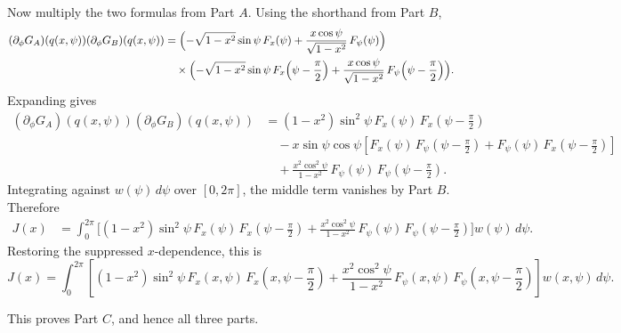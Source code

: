 Now multiply the two formulas from Part \(A\). Using the shorthand from Part \(B\),
\[
\begin{aligned}
(\partial_\phi G_A)(q(x,\psi))(\partial_\phi G_B)(q(x,\psi))
&=
\Bigl(
-\sqrt{1-x^2}\sin\psi\,F_x(\psi)
+
\frac{x\cos\psi}{\sqrt{1-x^2}}\,F_\psi(\psi)
\Bigr)\\
&\quad\times
\Bigl(
-\sqrt{1-x^2}\sin\psi\,F_x\!\left(\psi-\frac{\pi}{2}\right)
+
\frac{x\cos\psi}{\sqrt{1-x^2}}\,F_\psi\!\left(\psi-\frac{\pi}{2}\right)
\Bigr).
\end{aligned}
\]
Expanding gives
\[
\begin{aligned}
(\partial_\phi G_A)(q(x,\psi))(\partial_\phi G_B)(q(x,\psi))
&=
(1-x^2)\sin^2\psi\,F_x(\psi)\,F_x\!\left(\psi-\frac{\pi}{2}\right)\\
&\quad
-x\sin\psi\cos\psi
\left[
F_x(\psi)\,F_\psi\!\left(\psi-\frac{\pi}{2}\right)
+
F_\psi(\psi)\,F_x\!\left(\psi-\frac{\pi}{2}\right)
\right]\\
&\quad
+\frac{x^2\cos^2\psi}{1-x^2}\,
F_\psi(\psi)\,F_\psi\!\left(\psi-\frac{\pi}{2}\right).
\end{aligned}
\]
Integrating against \(w(\psi)\,d\psi\) over \([0,2\pi]\), the middle term vanishes by Part \(B\). Therefore
\[
\begin{aligned}
J(x)
&=
\int_0^{2\pi}
\Biggl[
(1-x^2)\sin^2\psi\,F_x(\psi)\,F_x\!\left(\psi-\frac{\pi}{2}\right)
+
\frac{x^2\cos^2\psi}{1-x^2}\,
F_\psi(\psi)\,F_\psi\!\left(\psi-\frac{\pi}{2}\right)
\Biggr]
w(\psi)\,d\psi.
\end{aligned}
\]
Restoring the suppressed \(x\)-dependence, this is
\[
J(x)
=
\int_0^{2\pi}
\left[
(1-x^2)\sin^2\psi\,F_x(x,\psi)\,F_x\!\left(x,\psi-\frac{\pi}{2}\right)
+
\frac{x^2\cos^2\psi}{1-x^2}\,
F_\psi(x,\psi)\,F_\psi\!\left(x,\psi-\frac{\pi}{2}\right)
\right]
w(x,\psi)\,d\psi.
\]

This proves Part \(C\), and hence all three parts.